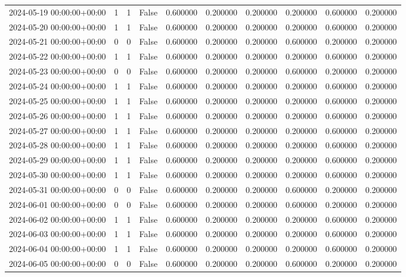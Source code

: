 \begin{tabular}{lrrrrrrrrr}
2024-05-19 00:00:00+00:00 & 1 & 1 & False & 0.600000 & 0.200000 & 0.200000 & 0.200000 & 0.600000 & 0.200000 \\
2024-05-20 00:00:00+00:00 & 1 & 1 & False & 0.600000 & 0.200000 & 0.200000 & 0.200000 & 0.600000 & 0.200000 \\
2024-05-21 00:00:00+00:00 & 0 & 0 & False & 0.600000 & 0.200000 & 0.200000 & 0.600000 & 0.200000 & 0.200000 \\
2024-05-22 00:00:00+00:00 & 1 & 1 & False & 0.600000 & 0.200000 & 0.200000 & 0.200000 & 0.600000 & 0.200000 \\
2024-05-23 00:00:00+00:00 & 0 & 0 & False & 0.600000 & 0.200000 & 0.200000 & 0.600000 & 0.200000 & 0.200000 \\
2024-05-24 00:00:00+00:00 & 1 & 1 & False & 0.600000 & 0.200000 & 0.200000 & 0.200000 & 0.600000 & 0.200000 \\
2024-05-25 00:00:00+00:00 & 1 & 1 & False & 0.600000 & 0.200000 & 0.200000 & 0.200000 & 0.600000 & 0.200000 \\
2024-05-26 00:00:00+00:00 & 1 & 1 & False & 0.600000 & 0.200000 & 0.200000 & 0.200000 & 0.600000 & 0.200000 \\
2024-05-27 00:00:00+00:00 & 1 & 1 & False & 0.600000 & 0.200000 & 0.200000 & 0.200000 & 0.600000 & 0.200000 \\
2024-05-28 00:00:00+00:00 & 1 & 1 & False & 0.600000 & 0.200000 & 0.200000 & 0.200000 & 0.600000 & 0.200000 \\
2024-05-29 00:00:00+00:00 & 1 & 1 & False & 0.600000 & 0.200000 & 0.200000 & 0.200000 & 0.600000 & 0.200000 \\
2024-05-30 00:00:00+00:00 & 1 & 1 & False & 0.600000 & 0.200000 & 0.200000 & 0.200000 & 0.600000 & 0.200000 \\
2024-05-31 00:00:00+00:00 & 0 & 0 & False & 0.600000 & 0.200000 & 0.200000 & 0.600000 & 0.200000 & 0.200000 \\
2024-06-01 00:00:00+00:00 & 0 & 0 & False & 0.600000 & 0.200000 & 0.200000 & 0.600000 & 0.200000 & 0.200000 \\
2024-06-02 00:00:00+00:00 & 1 & 1 & False & 0.600000 & 0.200000 & 0.200000 & 0.200000 & 0.600000 & 0.200000 \\
2024-06-03 00:00:00+00:00 & 1 & 1 & False & 0.600000 & 0.200000 & 0.200000 & 0.200000 & 0.600000 & 0.200000 \\
2024-06-04 00:00:00+00:00 & 1 & 1 & False & 0.600000 & 0.200000 & 0.200000 & 0.200000 & 0.600000 & 0.200000 \\
2024-06-05 00:00:00+00:00 & 0 & 0 & False & 0.600000 & 0.200000 & 0.200000 & 0.600000 & 0.200000 & 0.200000 \\

\end{tabular}
